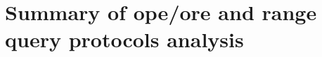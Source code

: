 \chapter{Summary of \acrshort{ope}/\acrshort{ore} and range query protocols analysis}\label{appendix:ore-results}
\thispagestyle{myheadings}

	

	
